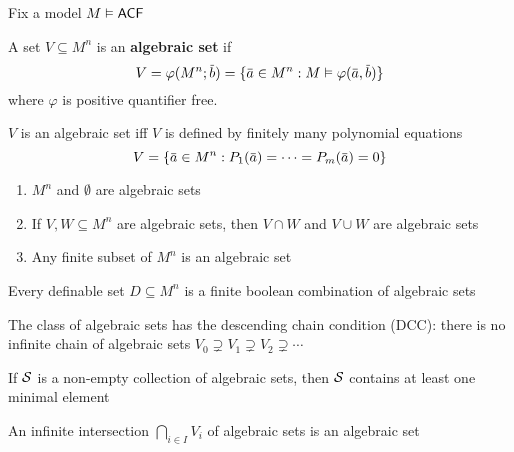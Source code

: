 \documentclass[11pt]{article}
\begin{document}
Fix a model \(M\vDash\textsf{ACF}\)

\begin{definition}[]
A set \(V\subseteq M^n\) is an \textbf{algebraic set} if
\begin{equation*}
V=\varphi(M^n;\barb)=\{\bara\in M^n:M\vDash\varphi(\bara,\barb)\}
\end{equation*}
where \(\varphi\) is positive quantifier free.
\end{definition}

\begin{remark}
\(V\) is an algebraic set iff \(V\) is defined by finitely many polynomial equations
\begin{equation*}
V=\{\bara\in M^n:P_1(\bara)=\dots=P_m(\bara)=0\}
\end{equation*}
\end{remark}

\begin{lemma}[]
\begin{enumerate}
\item \(M^n\) and \(\emptyset\) are algebraic sets
\item If \(V,W\subseteq M^n\) are algebraic sets, then \(V\cap W\) and \(V\cup W\) are algebraic sets
\item Any finite subset of \(M^n\) is an algebraic set
\end{enumerate}
\end{lemma}

\begin{fact}
Every definable set \(D\subseteq M^n\) is a finite boolean combination of algebraic sets
\end{fact}

\begin{fact}
The class of algebraic sets has the descending chain condition (DCC): there is no infinite chain
of algebraic sets \(V_0\supsetneq V_1\supsetneq V_2\supsetneq\cdots\)
\end{fact}

\begin{corollary}[]
If \(\mathcal{S}\) is a non-empty collection of algebraic sets, then \(\mathcal{S}\) contains at least one minimal element
\end{corollary}

\begin{corollary}[]
An infinite intersection \(\bigcap_{i\in I}V_i\) of algebraic sets is an algebraic set
\end{corollary}
\end{document}
